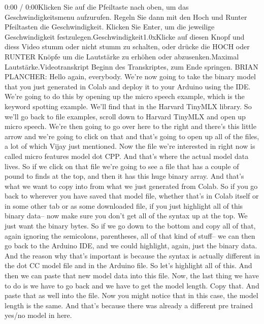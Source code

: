     0:00 / 0:00Klicken Sie auf die Pfeiltaste nach oben, um das Geschwindigkeitsmenu aufzurufen. Regeln Sie dann mit den Hoch und Runter Pfeiltasten die Geschwindigkeit. Klicken Sie Enter, um die jeweilige Geschwindigkeit festzulegen.Geschwindigkeit1.0xKlicke auf diesen Knopf und diess Video stumm oder nicht stumm zu schalten, oder drücke die HOCH oder RUNTER Knöpfe um die Lautstärke zu erhöhen oder abzusenken.Maximal Lautstärke.Videotranskript
    Beginn des Transkriptes, zum Ende springen.
    BRIAN PLANCHER: Hello again, everybody.
    We're now going to take the binary model that you just generated in Colab
    and deploy it to your Arduino using the IDE.
    We're going to do this by opening up the micro speech example, which
    is the keyword spotting example.
    We'll find that in the Harvard TinyMLX library.
    So we'll go back to file examples, scroll down to Harvard TinyMLX
    and open up micro speech.
    We're then going to go over here to the right and there's this little arrow
    and we're going to click on that and that's
    going to open up all of the files, a lot of which Vijay just mentioned.
    Now the file we're interested in right now
    is called micro features model dot CPP.
    And that's where the actual model data lives.
    So if we click on that file we're going to see
    a file that has a couple of pound to finds at the top,
    and then it has this huge binary array.
    And that's what we want to copy into from what we just generated from Colab.
    So if you go back to wherever you have saved that model file,
    whether that's in Colab itself or in some other tab
    or as some downloaded file, if you just highlight all of this binary data--
    now make sure you don't get all of the syntax up at the top.
    We just want the binary bytes.
    So if we go down to the bottom and copy all of that,
    again ignoring the semicolons, parentheses,
    all of that kind of stuff--
    we can then go back to the Arduino IDE, and we could highlight, again,
    just the binary data.
    And the reason why that's important is because the syntax is actually
    different in the dot CC model file and in the Arduino file.
    So let's highlight all of this.
    And then we can paste that new model data into this file.
    Now, the last thing we have to do is we have to go back
    and we have to get the model length.
    Copy that.
    And paste that as well into the file.
    Now you might notice that in this case, the model length is the same.
    And that's because there was already a different pre trained yes/no
    model in here.
